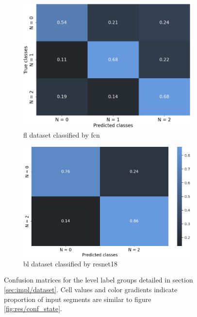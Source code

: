 \begin{figure}[h]
    \begin{subfigure}[b]{0.471\textwidth}
        \centering
        \includegraphics[width=\textwidth]{figures/res_FCN_flevel_cm.png}
        \caption{\acrshort{fl} dataset classified by \acrlong{fcn}}
        \label{fig:res/conf_flevel}
    \end{subfigure}
    \begin{subfigure}[b]{0.529\textwidth}
        \centering
        \includegraphics[width=\textwidth]{figures/res_ResNet18_blevel_cm.png}
        \caption{\acrshort{bl} dataset classified by \acrlong{resnet18}}
        \label{fig:res/conf_blevel}
    \end{subfigure}
    \caption{Confusion matrices for the level label groups detailed in section \ref{sec:impl/dataset}. Cell values and color gradients indicate proportion of input segments are similar to figure \ref{fig:res/conf_state}.}
    \label{fig:res/conf_level}
\end{figure}
\FloatBarrier


